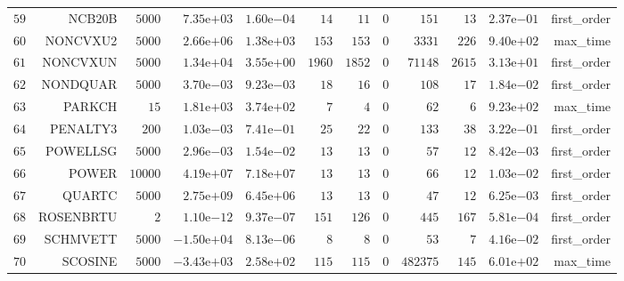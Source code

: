 \begin{longtable}{rrrrrrrrrrrr}
  \(    59\) & NCB20B & \(  5000\) & \( 7.35\)e\(+03\) & \( 1.60\)e\(-04\) & \(    14\) & \(    11\) & \(     0\) & \(   151\) & \(    13\) & \( 2.37\)e\(-01\) & first\_order \\
  \(    60\) & NONCVXU2 & \(  5000\) & \( 2.66\)e\(+06\) & \( 1.38\)e\(+03\) & \(   153\) & \(   153\) & \(     0\) & \(  3331\) & \(   226\) & \( 9.40\)e\(+02\) & max\_time \\
  \(    61\) & NONCVXUN & \(  5000\) & \( 1.34\)e\(+04\) & \( 3.55\)e\(+00\) & \(  1960\) & \(  1852\) & \(     0\) & \( 71148\) & \(  2615\) & \( 3.13\)e\(+01\) & first\_order \\
  \(    62\) & NONDQUAR & \(  5000\) & \( 3.70\)e\(-03\) & \( 9.23\)e\(-03\) & \(    18\) & \(    16\) & \(     0\) & \(   108\) & \(    17\) & \( 1.84\)e\(-02\) & first\_order \\
  \(    63\) & PARKCH & \(    15\) & \( 1.81\)e\(+03\) & \( 3.74\)e\(+02\) & \(     7\) & \(     4\) & \(     0\) & \(    62\) & \(     6\) & \( 9.23\)e\(+02\) & max\_time \\
  \(    64\) & PENALTY3 & \(   200\) & \( 1.03\)e\(-03\) & \( 7.41\)e\(-01\) & \(    25\) & \(    22\) & \(     0\) & \(   133\) & \(    38\) & \( 3.22\)e\(-01\) & first\_order \\
  \(    65\) & POWELLSG & \(  5000\) & \( 2.96\)e\(-03\) & \( 1.54\)e\(-02\) & \(    13\) & \(    13\) & \(     0\) & \(    57\) & \(    12\) & \( 8.42\)e\(-03\) & first\_order \\
  \(    66\) & POWER & \( 10000\) & \( 4.19\)e\(+07\) & \( 7.18\)e\(+07\) & \(    13\) & \(    13\) & \(     0\) & \(    66\) & \(    12\) & \( 1.03\)e\(-02\) & first\_order \\
  \(    67\) & QUARTC & \(  5000\) & \( 2.75\)e\(+09\) & \( 6.45\)e\(+06\) & \(    13\) & \(    13\) & \(     0\) & \(    47\) & \(    12\) & \( 6.25\)e\(-03\) & first\_order \\
  \(    68\) & ROSENBRTU & \(     2\) & \( 1.10\)e\(-12\) & \( 9.37\)e\(-07\) & \(   151\) & \(   126\) & \(     0\) & \(   445\) & \(   167\) & \( 5.81\)e\(-04\) & first\_order \\
  \(    69\) & SCHMVETT & \(  5000\) & \(-1.50\)e\(+04\) & \( 8.13\)e\(-06\) & \(     8\) & \(     8\) & \(     0\) & \(    53\) & \(     7\) & \( 4.16\)e\(-02\) & first\_order \\
  \(    70\) & SCOSINE & \(  5000\) & \(-3.43\)e\(+03\) & \( 2.58\)e\(+02\) & \(   115\) & \(   115\) & \(     0\) & \(482375\) & \(   145\) & \( 6.01\)e\(+02\) & max\_time \\

\end{longtable}

